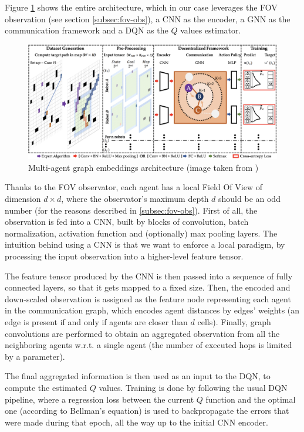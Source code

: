 \documentclass[a4paper,10pt]{report}
\begin{document}
Figure \ref{fig:dqn-gnn-robot} shows the entire architecture, which in our case leverages the FOV observation (see section \ref{subsec:fov-obs}), a CNN as the encoder, a GNN as the communication framework and a DQN as the $Q$ values estimator.  

\begin{figure}[h]
	\includegraphics[width=\textwidth]{dqn-gnn-robot.png}
	\caption{Multi-agent graph embeddings architecture (image taken from \cite{dqn-gnn-robot})}
	\label{fig:dqn-gnn-robot}
\end{figure}

Thanks to the FOV observator, each agent has a local Field Of View of dimension $d\times d$, where the observator's maximum depth $d$ should be an odd number (for the reasons described in \ref{subsec:fov-obs}). First of all, the observation is fed into a CNN, built by blocks of convolution, batch normalization, activation function and (optionally) max pooling layers. The intuition behind using a CNN is that we want to enforce a local paradigm, by processing the input observation into a higher-level feature tensor.

The feature tensor produced by the CNN is then passed into a sequence of fully connected layers, so that it gets mapped to a fixed size. Then, the encoded and down-scaled observation is assigned as the feature node representing each agent in the communication graph, which encodes agent distances by edges' weights (an edge is present if and only if agents are closer than $d$ cells). Finally, graph convolutions are performed to obtain an aggregated observation from all the neighboring agents w.r.t. a single agent (the number of executed hops is limited by a parameter).

The final aggregated information is then used as an input to the DQN, to compute the estimated $Q$ values. Training is done by following the usual DQN pipeline, where a regression loss between the current $Q$ function and the optimal one (according to Bellman's equation) is used to backpropagate the errors that were made during that epoch, all the way up to the initial CNN encoder.
\end{document}
